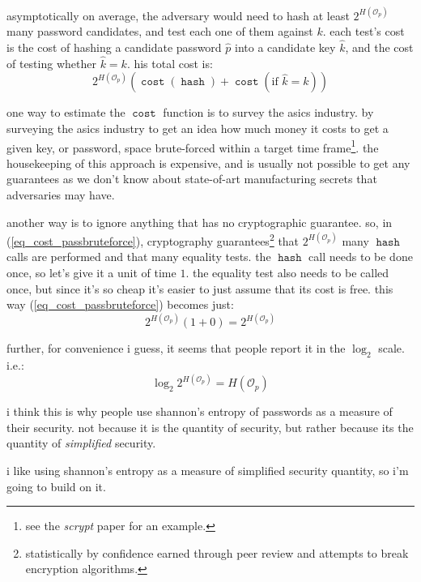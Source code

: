 \documentclass[twocolumn]{article}
\DeclareMathOperator{\hash}{\mathtt{hash}}
\DeclareMathOperator{\cost}{\mathtt{cost}}
\begin{document}
asymptotically on average, the adversary would need to hash at least
$2^{H(\mathcal{O}_p)}$ many password candidates, and test each one of them
against $k$.  each test's cost is the cost of hashing a candidate password
$\hat p$ into a candidate key $\hat k$, and the cost of testing whether
$\hat k = k$.  his total cost is:
\begin{equation}\label{eq_cost_passbruteforce}
    2^{H(\mathcal{O}_p)} \left(
        \cost(\hash) + \cost(\text{if } \hat k = k)
    \right)
\end{equation}

one way to estimate the $\cost$ function is to survey the asics industry.
by surveying the asics industry to get an idea how much money it costs to
get a given key, or password, space brute-forced within a target time
frame\footnote{see the \emph{scrypt} paper for an example.}.  the
housekeeping of this approach is expensive, and is usually not possible to
get any guarantees as we don't know about state-of-art manufacturing
secrets that adversaries may have.

another way is to ignore anything that has no cryptographic guarantee.  so,
in (\ref{eq_cost_passbruteforce}), cryptography
guarantees\footnote{statistically by confidence earned through peer review
and attempts to break encryption algorithms.} that $2^{H(\mathcal{O}_p)}$
many $\hash$ calls are performed and that many equality tests.  the $\hash$
call needs to be done once, so let's give it a unit of time $1$.  the
equality test also needs to be called once, but since it's so cheap it's
easier to just assume that its cost is free.  this way
(\ref{eq_cost_passbruteforce}) becomes just:
\begin{equation}\label{eq_simplecost_passbruteforce}
    2^{H(\mathcal{O}_p)} (1+0) = 2^{H(\mathcal{O}_p)}
\end{equation}

further, for convenience i guess, it seems that people report it in the
$\log_2$ scale.  i.e.:
\begin{equation}\label{eq_pass_entropy}
    \log_2 2^{H(\mathcal{O}_p)} = H(\mathcal{O}_p)
\end{equation}

i think this is why people use shannon's entropy of passwords as a measure
of their security.  not because it is the quantity of security, but rather
because its the quantity of \emph{simplified} security.

i like using shannon's entropy as a measure of simplified security
quantity, so i'm going to build on it.
\end{document}
